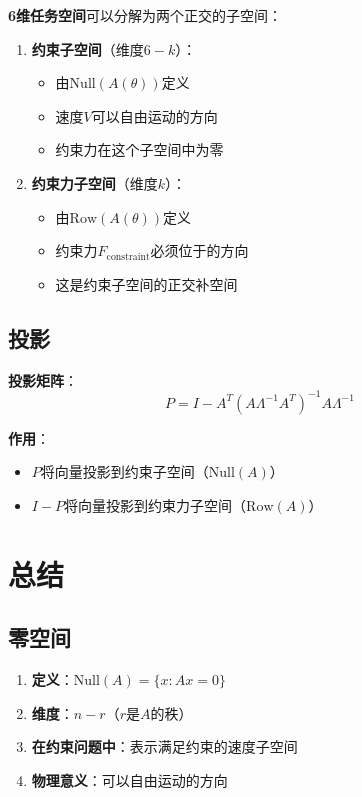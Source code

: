 \documentclass[12pt,a4paper]{article}
\begin{document}
\textbf{6维任务空间}可以分解为两个正交的子空间：

\begin{enumerate}
\item \textbf{约束子空间}（维度$6-k$）：
\begin{itemize}
\item 由$\text{Null}(A(\theta))$定义
\item 速度$V$可以自由运动的方向
\item 约束力在这个子空间中为零
\end{itemize}

\item \textbf{约束力子空间}（维度$k$）：
\begin{itemize}
\item 由$\text{Row}(A(\theta))$定义
\item 约束力$F_{\text{constraint}}$必须位于的方向
\item 这是约束子空间的正交补空间
\end{itemize}
\end{enumerate}

\subsection{投影}

\textbf{投影矩阵}：
\begin{equation}
P = I - A^T(A\Lambda^{-1}A^T)^{-1}A\Lambda^{-1}
\end{equation}

\textbf{作用}：
\begin{itemize}
\item $P$将向量投影到约束子空间（$\text{Null}(A)$）
\item $I - P$将向量投影到约束力子空间（$\text{Row}(A)$）
\end{itemize}

\section{总结}

\subsection{零空间}

\begin{enumerate}
\item \textbf{定义}：$\text{Null}(A) = \{x : Ax = 0\}$
\item \textbf{维度}：$n - r$（$r$是$A$的秩）
\item \textbf{在约束问题中}：表示满足约束的速度子空间
\item \textbf{物理意义}：可以自由运动的方向
\end{enumerate}
\end{document}
